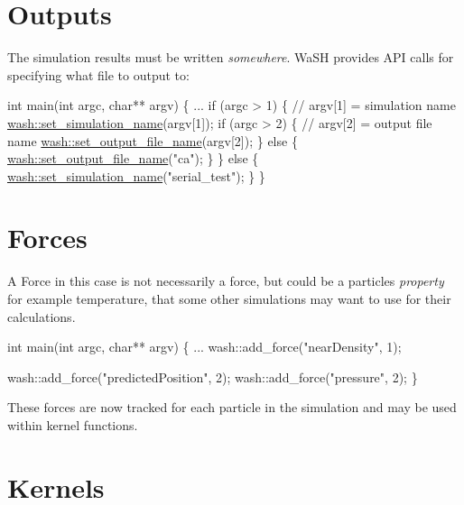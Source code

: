 \section*{Outputs}

The simulation results must be written {\itshape somewhere}. Wa\+SH provides A\+PI calls for specifying what file to output to\+: 
\begin{DoxyCode}
\textcolor{keywordtype}{int} main(\textcolor{keywordtype}{int} argc, \textcolor{keywordtype}{char}** argv) \{
    ...
    \textcolor{keywordflow}{if} (argc > 1) \{
        \textcolor{comment}{// argv[1] = simulation name}
        \mbox{\hyperlink{namespacewash_a4ddbab848bef96e0fc69bf8e280d4775}{wash::set\_simulation\_name}}(argv[1]);
        \textcolor{keywordflow}{if} (argc > 2) \{
            \textcolor{comment}{// argv[2] = output file name}
            \mbox{\hyperlink{namespacewash_ad6de17b9a27f58f6245a68ede303e84b}{wash::set\_output\_file\_name}}(argv[2]);
        \} \textcolor{keywordflow}{else} \{
            \mbox{\hyperlink{namespacewash_ad6de17b9a27f58f6245a68ede303e84b}{wash::set\_output\_file\_name}}(\textcolor{stringliteral}{"ca"});
        \}
    \} \textcolor{keywordflow}{else} \{
        \mbox{\hyperlink{namespacewash_a4ddbab848bef96e0fc69bf8e280d4775}{wash::set\_simulation\_name}}(\textcolor{stringliteral}{"serial\_test"});
    \}
\}
\end{DoxyCode}


\section*{Forces}

A \textquotesingle{}Force\textquotesingle{} in this case is not necessarily a force, but could be a particle\textquotesingle{}s {\itshape property} for example temperature, that some other simulations may want to use for their calculations. 
\begin{DoxyCode}
\textcolor{keywordtype}{int} main(\textcolor{keywordtype}{int} argc, \textcolor{keywordtype}{char}** argv) \{
    ...
    wash::add\_force(\textcolor{stringliteral}{"nearDensity"}, 1);

    wash::add\_force(\textcolor{stringliteral}{"predictedPosition"}, 2);
    wash::add\_force(\textcolor{stringliteral}{"pressure"}, 2);
\}
\end{DoxyCode}
 These forces are now tracked for each particle in the simulation and may be used within kernel functions.

\section*{Kernels}

